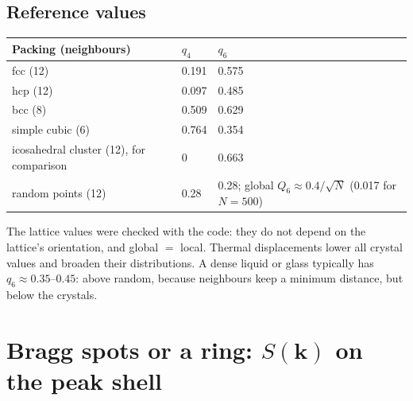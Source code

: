 \documentclass[11pt]{article}
\begin{document}
\subsection*{Reference values}
\begin{center}
\begin{tabular}{@{}l l l@{}}
\toprule
Packing (neighbours) & $q_4$ & $q_6$ \\
\midrule
fcc (12) & 0.191 & 0.575 \\
hcp (12) & 0.097 & 0.485 \\
bcc (8) & 0.509 & 0.629 \\
simple cubic (6) & 0.764 & 0.354 \\
icosahedral cluster (12), for comparison & 0 & 0.663 \\
random points (12) & 0.28 & 0.28; global $Q_6\approx0.4/\sqrt N$ (0.017 for $N=500$) \\
\bottomrule
\end{tabular}
\end{center}
The lattice values were checked with the code: they do not depend on the
lattice's orientation, and global $=$ local. Thermal displacements lower all
crystal values and broaden their distributions. A dense liquid or glass
typically has $q_6\approx0.35$--$0.45$: above random, because neighbours keep a
minimum distance, but below the crystals.

\section{\texorpdfstring{Bragg spots or a ring: $S(\mathbf k)$ on the peak shell}{Bragg spots or a ring}}
\end{document}
